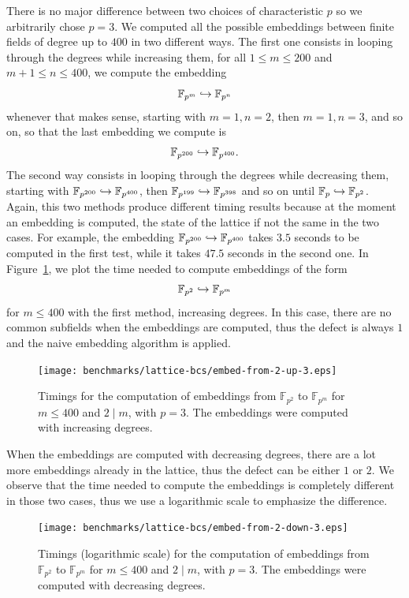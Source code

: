 There is no major difference between two choices of characteristic $p$ so we
arbitrarily chose $p=3$. We
computed all the possible embeddings between finite fields of degree up to $400$
in two different ways. The first one consists in looping through the degrees
while increasing them, \ie for all $1\leq m\leq200$ and $m+1 \leq n\leq 400$, we
compute the embedding 
\[
  \mathbb{F}_{p^{m}}\hookrightarrow \mathbb{F}_{p^{n}}
\]
whenever that makes sense, starting with $m=1, n=2$, then $m=1, n=3$, and so on, so
that the last embedding we compute is 
\[
  \mathbb{F}_{p^{200}}\hookrightarrow\mathbb{F}_{p^{400}}.
\]
The second way consists in looping through the
degrees while decreasing them, \ie starting with
$\mathbb{F}_{p^{200}}\hookrightarrow\mathbb{F}_{p^{400}}$, then
$\mathbb{F}_{p^{199}}\hookrightarrow\mathbb{F}_{p^{398}}$ and so on until
$\mathbb{F}_{p}\hookrightarrow\mathbb{F}_{p^{2}}$. Again, this two methods produce
different timing results because at the moment an embedding is computed, the
state of the lattice if not the same in the two cases. For example, the
embedding $\mathbb{F}_{p^{200}}\hookrightarrow\mathbb{F}_{p^{400}}$ takes $3.5$ seconds to
be computed in the first test, while it takes $47.5$ seconds in the second one.
In Figure~\ref{fig:bcs-embed-from-2-up}, we plot the time needed to compute
embeddings of the form
\[
  \mathbb{F}_{p^{2}}\hookrightarrow \mathbb{F}_{p^{m}}
\]
for $m\leq 400$ with the first method, \ie increasing degrees. In this case,
there are no common subfields when the embeddings are computed, thus the defect
is always $1$ and the naive embedding algorithm is applied.
\begin{figure}
  \centering
  \texttt{[image: benchmarks/lattice-bcs/embed-from-2-up-3.eps]}
  \caption{Timings for the computation of embeddings from $\mathbb{F}_{p^{2}}$
  to $\mathbb{F}_{p^{m}}$ for $m\leq 400$ and $2\mid m$, with $p=3$. The
  embeddings were computed with increasing degrees.}
  \label{fig:bcs-embed-from-2-up}
\end{figure}
When the embeddings are computed with decreasing degrees, there are a lot more
embeddings already in the lattice, thus the defect can be either $1$ or $2$. We
observe that the time needed to compute the embeddings is completely different
in those two cases, thus we use a logarithmic scale to emphasize the difference.
\begin{figure}
  \centering
  \texttt{[image: benchmarks/lattice-bcs/embed-from-2-down-3.eps]}
  \caption{Timings (logarithmic scale) for the computation of embeddings from
    $\mathbb{F}_{p^{2}}$ to $\mathbb{F}_{p^{m}}$ for $m\leq 400$ and $2\mid m$,
  with $p=3$. The embeddings were computed with decreasing degrees.}
  \label{fig:bcs-embed-from-2-down}
\end{figure}
